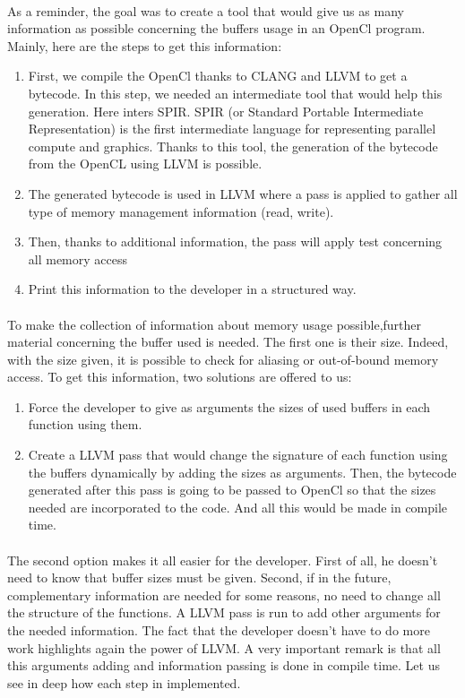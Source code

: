 \documentclass{article}
\begin{document}
\begin{itemize}
\paragraph{}
As a reminder, the goal was to create a tool that would give us as many information as possible concerning the buffers usage in an OpenCl program. Mainly, here are the steps to get this information:
\begin{enumerate}
\item First, we compile the OpenCl thanks to CLANG and LLVM to get a bytecode. In this step, we needed an intermediate tool that would help this generation. Here inters SPIR. SPIR (or Standard Portable Intermediate Representation) is the first intermediate language for representing parallel compute and graphics. Thanks to this tool, the generation of the bytecode from the OpenCL using LLVM is possible.
\item The generated bytecode is used in LLVM where a pass is applied to gather all type of memory management information (read, write).
\item Then, thanks to additional information, the pass will apply test concerning all memory access
\item Print this information to the developer in a structured way.
\end{enumerate}

\paragraph{}
To make the collection of information about memory usage possible,further material concerning the buffer used is needed. The first one is their size. Indeed, with the size given, it is possible to check for aliasing or out-of-bound memory access. To get this information, two solutions are offered to us:
\begin{enumerate}
\item Force the developer to give as arguments the sizes of used buffers in each function using them.
\item Create a LLVM pass that would change the signature of each function using the buffers dynamically by adding the sizes as arguments. Then, the bytecode generated after this pass is going to be passed to OpenCl so that the sizes needed are incorporated to the code. And all this would be made in compile time.
\end{enumerate}

\paragraph{}
The second option makes it all easier for the developer. First of all, he doesn't need to know that buffer sizes must be given. Second, if in the future, complementary information are needed for some reasons, no need to change all the structure of the functions. A LLVM pass is run to add other arguments for the needed information. The fact that the developer doesn't have to do more work highlights again the power of LLVM. A very important remark is that all this arguments adding and information passing is done in compile time.
Let us see in deep how each step in implemented.


\end{itemize}
\end{document}
